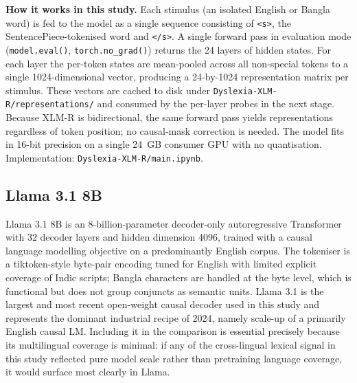 \textbf{How it works in this study.} Each stimulus (an isolated English or Bangla word) is fed to the model as a single sequence consisting of \texttt{<s>}, the SentencePiece-tokenised word and \texttt{</s>}. A single forward pass in evaluation mode (\texttt{model.eval()}, \texttt{torch.no\_grad()}) returns the 24 layers of hidden states. For each layer the per-token states are mean-pooled across all non-special tokens to a single 1024-dimensional vector, producing a 24-by-1024 representation matrix per stimulus. These vectors are cached to disk under \texttt{Dyslexia-XLM-R/representations/} and consumed by the per-layer probes in the next stage. Because XLM-R is bidirectional, the same forward pass yields representations regardless of token position; no causal-mask correction is needed. The model fits in 16-bit precision on a single 24~GB consumer GPU with no quantisation. Implementation: \texttt{Dyslexia-XLM-R/main.ipynb}.

\subsection{Llama 3.1 8B}

Llama 3.1 8B \cite{dubey2024llama3} is an 8-billion-parameter decoder-only autoregressive Transformer with 32 decoder layers and hidden dimension 4096, trained with a causal language modelling objective on a predominantly English corpus. The tokeniser is a tiktoken-style byte-pair encoding tuned for English with limited explicit coverage of Indic scripts; Bangla characters are handled at the byte level, which is functional but does not group conjuncts as semantic units. Llama 3.1 is the largest and most recent open-weight causal decoder used in this study and represents the dominant industrial recipe of 2024, namely scale-up of a primarily English causal LM. Including it in the comparison is essential precisely because its multilingual coverage is minimal: if any of the cross-lingual lexical signal in this study reflected pure model scale rather than pretraining language coverage, it would surface most clearly in Llama.

